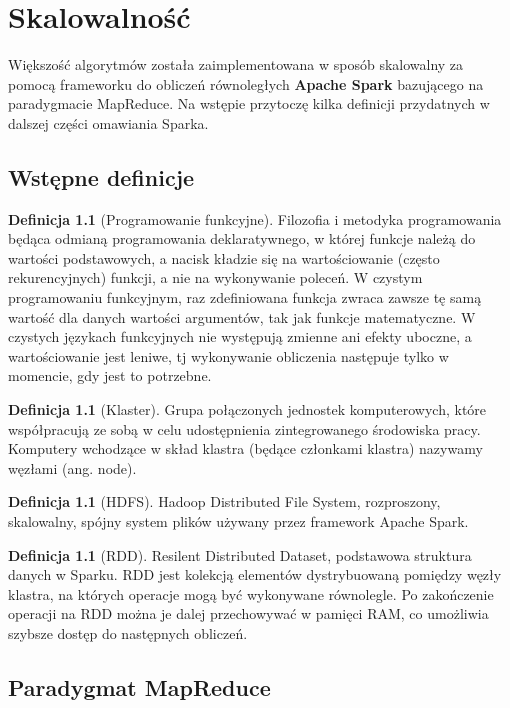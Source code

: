 \documentclass[magisterska]{pracamgr}
\theoremstyle{plain}
\theoremstyle{definition}
\newtheorem{definicja}[thm]{Definicja}
\theoremstyle{remark}
\begin{document}
\chapter{Skalowalność}

Większość algorytmów została zaimplementowana w sposób skalowalny za pomocą frameworku 
do obliczeń równoległych \textbf{Apache Spark} bazującego na paradygmacie MapReduce.
Na wstępie przytoczę kilka definicji przydatnych w dalszej części omawiania Sparka.

\section{Wstępne definicje}
\begin{definicja}[Programowanie funkcyjne]
Filozofia i metodyka programowania będąca odmianą programowania deklaratywnego, 
w której funkcje należą do wartości podstawowych, a nacisk kładzie się na wartościowanie 
(często rekurencyjnych) funkcji, a nie na wykonywanie poleceń.
W czystym programowaniu funkcyjnym, raz zdefiniowana funkcja zwraca zawsze 
tę samą wartość dla danych wartości argumentów, tak jak funkcje matematyczne.
W czystych językach funkcyjnych nie występują zmienne ani efekty uboczne, 
a wartościowanie jest leniwe, tj wykonywanie obliczenia następuje tylko w momencie, gdy jest to potrzebne.
\end{definicja}

\begin{definicja}[Klaster]
Grupa połączonych jednostek komputerowych, które współpracują ze sobą w celu udostępnienia zintegrowanego środowiska pracy.
Komputery wchodzące w skład klastra (będące członkami klastra) nazywamy węzłami (ang. node).
\end{definicja}

\begin{definicja}[HDFS]
Hadoop Distributed File System, rozproszony, skalowalny, spójny system plików używany przez framework Apache Spark.
\end{definicja}

\begin{definicja}[RDD]
Resilent Distributed Dataset, podstawowa struktura danych w Sparku. RDD jest kolekcją elementów dystrybuowaną pomiędzy 
węzły klastra, na których operacje mogą być wykonywane równolegle. Po zakończenie operacji na RDD można je dalej 
przechowywać w pamięci RAM, co umożliwia szybsze dostęp do następnych obliczeń. 
\end{definicja}


\section{Paradygmat MapReduce}
\end{document}
